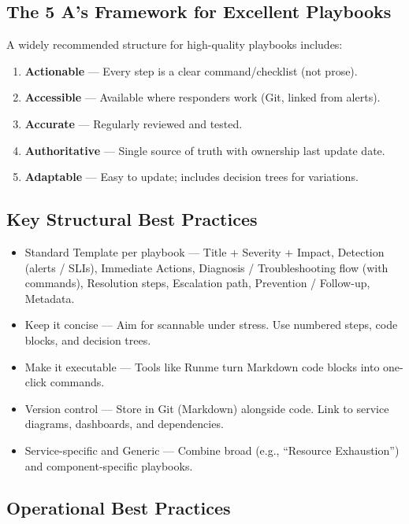 \documentclass{article}
\begin{document}
\subsection{The 5 A’s Framework for Excellent Playbooks}

A widely recommended structure for high-quality playbooks includes:

\begin{enumerate}
    \item \textbf{Actionable} — Every step is a clear command/checklist (not prose).
    \item \textbf{Accessible} — Available where responders work (Git, linked from alerts).
    \item \textbf{Accurate} — Regularly reviewed and tested.
    \item \textbf{Authoritative} — Single source of truth with ownership last update date.
    \item \textbf{Adaptable} — Easy to update; includes decision trees for variations.
\end{enumerate}

\newpage
\subsection{Key Structural Best Practices}

\begin{itemize}
    \item Standard Template per playbook — Title + Severity + Impact, Detection (alerts / SLIs),
          Immediate Actions, Diagnosis / Troubleshooting flow (with commands), Resolution steps, Escalation path, Prevention / Follow-up, Metadata.
    \item Keep it concise — Aim for scannable under stress. Use numbered steps, code blocks, and decision trees.
    \item Make it executable — Tools like Runme turn Markdown code blocks into one-click commands.
    \item Version control — Store in Git (Markdown) alongside code. Link to service diagrams, dashboards, and dependencies.
    \item Service-specific and Generic — Combine broad (e.g., “Resource Exhaustion”) and component-specific playbooks.
\end{itemize}

\subsection{Operational Best Practices}
\end{document}
